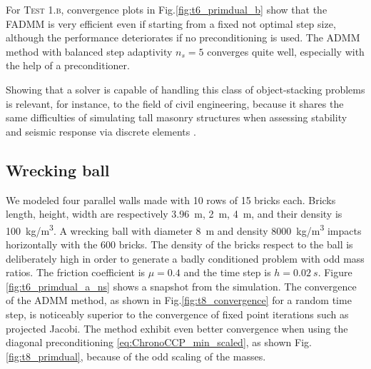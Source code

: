 \documentclass[final,3p]{elsarticle}
\begin{document}
For \textsc{Test 1.b}, convergence plots in Fig.\ref{fig:t6_primdual_b} show that the FADMM is very efficient even if starting from 
a fixed not optimal step size, although the performance deteriorates if no preconditioning is used. The ADMM method with balanced 
step adaptivity $n_s=5$ converges quite well, especially with the help of a preconditioner.

Showing that a solver is capable of handling this class of object-stacking problems is relevant, for instance,
to the field of civil engineering, because it shares the same difficulties of simulating tall masonry structures 
when assessing stability and seismic response via discrete elements \cite{Beatini2017}. 



\subsection{Wrecking ball}

We modeled four parallel walls made with 10 rows of 15 bricks each. Bricks length, height, width are respectively \SI{3.96}{m}, \SI{2}{m}, \SI{4}{m}, and their density is \SI{100}{kg/m^3}.  A wrecking ball with diameter \SI{8}{m} and density \SI{8000}{kg/m^3} impacts horizontally with the 600 bricks.  The density of the bricks respect to the ball is deliberately high in order to generate a badly conditioned problem with odd mass ratios. The friction coefficient is $\mu=0.4$ and the time step is $h=\SI{0.02}{s}$. Figure \ref{fig:t6_primdual_a_ns} shows a snapshot from the simulation.
The convergence of the ADMM method, as shown in Fig.\ref{fig:t8_convergence} for a random time step, is noticeably superior to the convergence of fixed point iterations such as projected Jacobi. The method exhibit even better convergence when using the diagonal preconditioning \eqref{eq:ChronoCCP_min_scaled}, as shown Fig.\ref{fig:t8_primdual}, because of the odd scaling of the masses.
\end{document}
